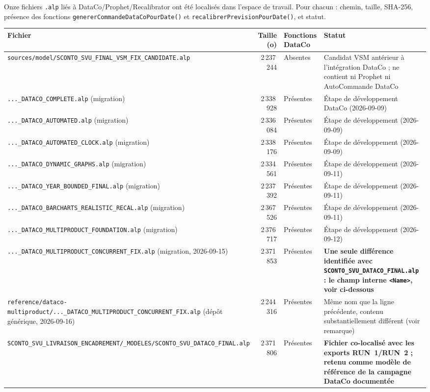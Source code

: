 \documentclass[11pt,a4paper]{article}
\newcommand{\code}[1]{\texttt{#1}}
\begin{document}
Onze fichiers \code{.alp} liés à DataCo/Prophet/Recalibrator ont été
localisés dans l'espace de travail. Pour chacun : chemin, taille, SHA-256,
présence des fonctions \code{genererCommandeDataCoPourDate()} et
\code{recalibrerPrevisionPourDate()}, et statut.

\begin{center}
\small
\begin{tabularx}{\textwidth}{p{4.0cm}rp{1.3cm}X}
\toprule
Fichier & Taille (o) & Fonctions DataCo & Statut \\
\midrule
\code{sources/\allowbreak model/\allowbreak SCONTO\_\allowbreak SVU\_FINAL\_\allowbreak VSM\_FIX\_\allowbreak CANDIDATE.alp} & 2\,237\,244 & Absentes & Candidat VSM antérieur à l'intégration DataCo ; ne contient ni Prophet ni AutoCommande DataCo \\
\code{...\_DATACO\_\allowbreak COMPLETE.alp} (migration) & 2\,338\,928 & Présentes & Étape de développement DataCo (2026-09-09) \\
\code{...\_DATACO\_\allowbreak AUTOMATED.alp} (migration) & 2\,336\,084 & Présentes & Étape de développement (2026-09-09) \\
\code{...\_DATACO\_\allowbreak AUTOMATED\_\allowbreak CLOCK.alp} (migration) & 2\,338\,176 & Présentes & Étape de développement (2026-09-09) \\
\code{...\_DATACO\_\allowbreak DYNAMIC\_\allowbreak GRAPHS.alp} (migration) & 2\,334\,561 & Présentes & Étape de développement (2026-09-11) \\
\code{...\_DATACO\_\allowbreak YEAR\_\allowbreak BOUNDED\_\allowbreak FINAL.alp} (migration) & 2\,237\,392 & Présentes & Étape de développement (2026-09-11) \\
\code{...\_DATACO\_\allowbreak BARCHARTS\_\allowbreak REALISTIC\_\allowbreak RECAL.alp} (migration) & 2\,367\,526 & Présentes & Étape de développement (2026-09-11) \\
\code{...\_DATACO\_\allowbreak MULTIPRODUCT\_\allowbreak FOUNDATION.alp} (migration) & 2\,376\,717 & Présentes & Étape de développement (2026-09-12) \\
\code{...\_DATACO\_\allowbreak MULTIPRODUCT\_\allowbreak CONCURRENT\_\allowbreak FIX.alp} (migration, 2026-09-15) & 2\,371\,853 & Présentes & \textbf{Une seule différence identifiée avec \code{SCONTO\_SVU\_\allowbreak DATACO\_FINAL.alp} : le champ interne \code{<Name>}, voir ci-dessous} \\
\code{reference/\allowbreak dataco-\allowbreak multiproduct/\allowbreak ...\_DATACO\_\allowbreak MULTIPRODUCT\_\allowbreak CONCURRENT\_\allowbreak FIX.alp} (dépôt générique, 2026-09-16) & 2\,244\,316 & Présentes & Même nom que la ligne précédente, contenu substantiellement différent (voir remarque) \\
\code{SCONTO\_SVU\_\allowbreak LIVRAISON\_\allowbreak ENCADREMENT/\allowbreak 01\_MODELES/\allowbreak SCONTO\_SVU\_\allowbreak DATACO\_FINAL.alp} & 2\,371\,806 & Présentes & \textbf{Fichier co-localisé avec les exports RUN~1/RUN~2 ; retenu comme modèle de référence de la campagne DataCo documentée} \\
\bottomrule
\end{tabularx}
\end{center}
\end{document}
